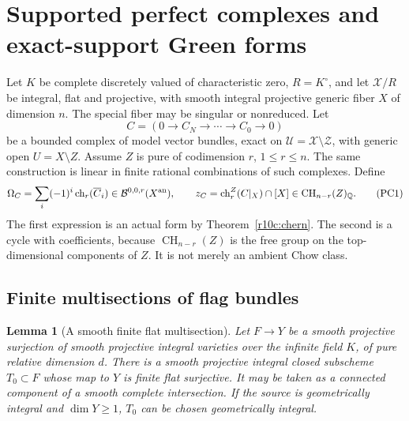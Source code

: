 \documentclass[11pt]{article}
\newtheorem{lemma}[theorem]{Lemma}
\theoremstyle{definition}
\theoremstyle{remark}
\numberwithin{equation}{section}
\begin{document}
\section{Supported perfect complexes and exact-support Green forms}
\label{r11p:supported-complex}

Let $K$ be complete discretely valued of characteristic zero, $R=K^\circ$,
and let $\mathcal X/R$ be integral, flat and projective, with smooth
integral projective generic fiber $X$ of dimension $n$.
The special fiber may be singular or nonreduced.  Let
\[
       C=(0\longrightarrow C_N\longrightarrow\cdots
                             \longrightarrow C_0\longrightarrow0)
\]
be a bounded complex of model vector bundles, exact on
$\mathcal U=\mathcal X\setminus\mathcal Z$, with generic open
$U=X\setminus Z$.  Assume $Z$ is pure of codimension $r$, $1\leq r\leq n$.
The same construction is linear in finite rational combinations of
such complexes.  Define
\[
 \Omega_C=\sum_i(-1)^i\operatorname{ch}_r(\overline C_i)
                              \in\mathcal B^{0,0,r}(X^{\rm an}),
 \qquad
 z_C=\operatorname{ch}^{Z}_r(C|_X)\cap[X]
                              \in\operatorname{CH}_{n-r}(Z)_{\mathbb Q}.
\tag{PC1}\label{r11p:omega-and-cycle}
\]
The first expression is an actual form by Theorem~\ref{r10c:chern}.
The second is a cycle with coefficients, because
$\operatorname{CH}_{n-r}(Z)$ is the free group on the top-dimensional
components of $Z$.  It is not merely an ambient Chow class.

\subsection{Finite multisections of flag bundles}

\begin{lemma}[A smooth finite flat multisection]
\label{r11p:multisection}
Let $F\to Y$ be a smooth projective surjection of smooth projective
integral varieties over the infinite field $K$, of pure relative
dimension $d$.  There is a smooth projective integral closed subscheme
$T_0\subset F$ whose map to $Y$ is finite flat surjective.
It may be taken as a connected component of a smooth complete intersection.
If the source is geometrically integral and $\dim Y\geq1$, $T_0$
can be chosen geometrically integral.
\end{lemma}
\end{document}

